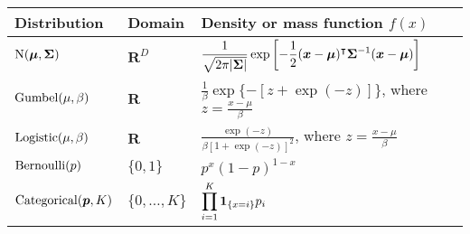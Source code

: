 \begin{tabularx}{\linewidth}{llX}
	Distribution & Domain                                                                                                               & Density or mass function $f(x)$ \\
	\midrule
	$\mathrm{N}( \bm{\mu}, \bm{\Sigma} )$
	             & $\mathbf{R}^D$
	             & $\displaystyle \frac{1}{\sqrt{2 \pi \lvert\bm{\Sigma}\rvert}}
	\exp \left[ -\frac{1}{2} (\bm{x} - \bm{\mu})^\intercal \bm{\Sigma}^{-1} (\bm{x} - \bm{\mu}) \right] $                                                                                             \\
	\rule{0pt}{5ex}%
	$\mathrm{Gumbel}( \mu, \beta )$
	             & $\mathbf{R}$
	             & $\displaystyle \frac{1}{\beta} \exp \{ - [z + \exp(-z)]\}$, where $\displaystyle z = \frac{x - \mu}{\beta}$                                                                 \\
	\rule{0pt}{5ex}%
	$\mathrm{Logistic}( \mu, \beta )$
	             & $\mathbf{R}$
	             & $\displaystyle \frac{\exp(-z)}{\beta \left[1 + \exp(-z) \right]^2}$, where $\displaystyle z = \frac{x - \mu}{\beta}$                                                        \\
	\rule{0pt}{5ex}%
	$\mathrm{Bernoulli}( p )$
	             & $\{0, 1\}$
	             & $\displaystyle p^x (1-p)^{1-x}$                                                                                                                                             \\
	\rule{0pt}{5ex}%
	$\mathrm{Categorical}( \bm{p}, K )$
	             & $\{0, \ldots, K\}$
	             & $\displaystyle \prod_{i=1}^K \bm{1}_{\left \{ x=i \right \} } p_i$                                                                                                                               \\
\end{tabularx}

\endgroup
